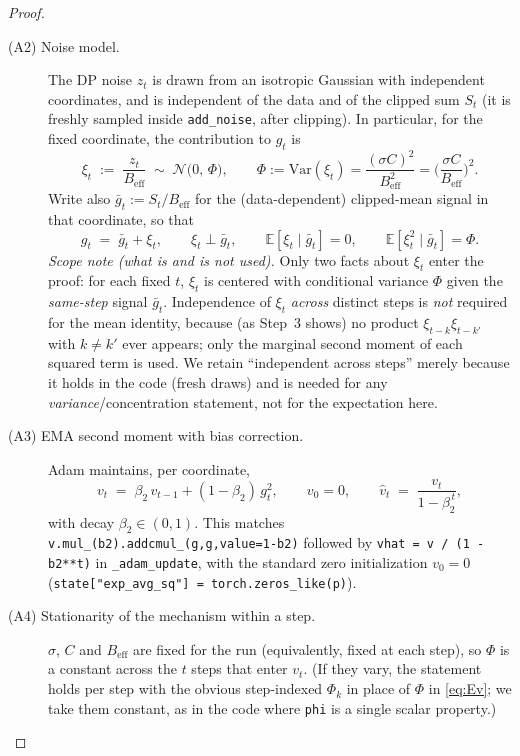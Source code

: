 \begin{proof}
\begin{description}
  \item[(A2) Noise model.] The DP noise $z_t$ is drawn from an isotropic Gaussian with
  independent coordinates, and is independent of the data and of the clipped sum $S_t$ (it is
  freshly sampled inside \texttt{add\_noise}, after clipping). In particular, for the fixed
  coordinate, the contribution to $g_t$ is
  \[
    \xi_t \;:=\; \frac{z_{t}}{B_{\mathrm{eff}}}\;\sim\;\mathcal N\!\big(0,\,\Phi\big),
    \qquad
    \Phi := \mathrm{Var}(\xi_t) = \frac{(\sigma C)^2}{B_{\mathrm{eff}}^2}=\Big(\frac{\sigma C}{B_{\mathrm{eff}}}\Big)^2 .
  \]
  Write also $\bar g_t := S_t/B_{\mathrm{eff}}$ for the (data-dependent) clipped-mean signal in
  that coordinate, so that
  \[
    g_t \;=\; \bar g_t + \xi_t,
    \qquad \xi_t\perp \bar g_t,\qquad \mathbb E[\xi_t\mid \bar g_t]=0,\qquad \mathbb E[\xi_t^2\mid \bar g_t]=\Phi.
  \]
  \emph{Scope note (what is and is not used).} Only two facts about $\xi_t$ enter the proof:
  for each fixed $t$, $\xi_t$ is centered with conditional variance $\Phi$ given the
  \emph{same-step} signal $\bar g_t$. Independence of $\xi_t$ \emph{across} distinct steps is
  \emph{not} required for the mean identity, because (as Step~3 shows) no product
  $\xi_{t-k}\xi_{t-k'}$ with $k\ne k'$ ever appears; only the marginal second moment of each
  squared term is used. We retain ``independent across steps'' merely because it holds in the
  code (fresh draws) and is needed for any \emph{variance}/concentration statement, not for the
  expectation here.

  \item[(A3) EMA second moment with bias correction.] Adam maintains, per coordinate,
  \[
    v_t \;=\; \beta_2\, v_{t-1} + (1-\beta_2)\, g_t^2,
    \qquad v_0 = 0,
    \qquad
    \hat v_t \;=\; \frac{v_t}{1-\beta_2^{\,t}},
  \]
  with decay $\beta_2\in(0,1)$. This matches \texttt{v.mul\_(b2).addcmul\_(g,g,value=1-b2)}
  followed by \texttt{vhat = v / (1 - b2**t)} in \texttt{\_adam\_update}, with the standard
  zero initialization $v_0=0$ (\texttt{state["exp\_avg\_sq"] = torch.zeros\_like(p)}).

  \item[(A4) Stationarity of the mechanism within a step.] $\sigma$, $C$ and $B_{\mathrm{eff}}$
  are fixed for the run (equivalently, fixed at each step), so $\Phi$ is a constant across the
  $t$ steps that enter $v_t$. (If they vary, the statement holds per step with the obvious
  step-indexed $\Phi_k$ in place of $\Phi$ in \eqref{eq:Ev}; we take them constant, as in the
  code where \texttt{phi} is a single scalar property.)
\end{description}


\end{proof}
